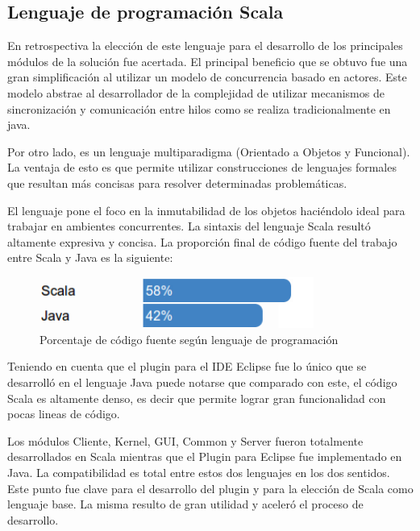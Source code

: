 \documentclass[12pt,a4paper]{article}
\begin{document}
\subsection{Lenguaje de programación Scala}
En retrospectiva la elección de este lenguaje para el desarrollo de los principales módulos de la solución fue
acertada. El principal beneficio que se obtuvo fue una gran simplificación al utilizar un modelo de concurrencia
basado en actores. Este modelo abstrae al desarrollador de la complejidad de utilizar mecanismos de sincronización
y comunicación entre hilos como se realiza tradicionalmente en java.

Por otro lado, es un lenguaje multiparadigma (Orientado a Objetos y Funcional). La ventaja de esto es que permite utilizar construcciones de lenguajes formales que resultan más concisas para resolver determinadas problemáticas.

El lenguaje pone el foco en la inmutabilidad de los objetos haciéndolo ideal para trabajar en ambientes concurrentes.
La sintaxis del lenguaje Scala resultó altamente expresiva y concisa. La proporción final de código fuente del trabajo entre Scala y Java es la siguiente:

	\begin{figure}[!ht]
		\begin{center}
			\includegraphics[width=9cm]{porcentaje.png}
			\caption{\label{porcentaje} Porcentaje de código fuente según lenguaje de programación }
		\end{center}
	\end{figure}

Teniendo en cuenta que el plugin para el IDE Eclipse fue lo único que se desarrolló en el lenguaje Java puede
notarse que comparado con este, el código Scala es altamente denso, es decir que permite lograr gran funcionalidad 
con pocas lineas de código.

Los módulos Cliente, Kernel, GUI, Common y Server fueron totalmente desarrollados en Scala mientras que el Plugin
para Eclipse fue implementado en Java. La compatibilidad es total entre estos dos lenguajes en los dos sentidos.
Este punto fue clave para el desarrollo del plugin y para la elección de Scala como lenguaje base. La misma 
resulto de gran utilidad y aceleró el proceso de desarrollo.
\end{document}
